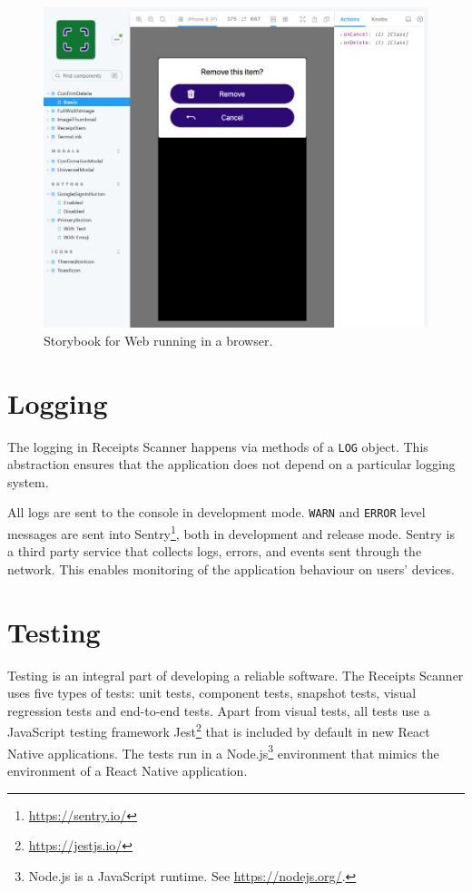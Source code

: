 \documentclass[
  printed, %
  table,   %
  oneside, %
  lof,     %
  lot,     %
]{fithesis3}
\begin{document}
\begin{figure}[H]
    \begin{center}
        \includegraphics[width=\textwidth]{figures/other/storybook_web}
    \end{center}
    \caption{Storybook for Web running in a browser.}
    \label{fig:storybook_web}
\end{figure}

\section{Logging}
The logging in Receipts Scanner happens via methods of a \texttt{LOG} object. This abstraction ensures that the application does not depend on a particular logging system.

All logs are sent to the console in development mode. \texttt{WARN} and \texttt{ERROR} level messages are sent into Sentry\footnote{\url{https://sentry.io/}}, both in development and release mode. Sentry is a third party service that collects logs, errors, and events sent through the network. This enables monitoring of the application behaviour on users' devices.

\section{Testing}
Testing is an integral part of developing a reliable software.
The Receipts Scanner uses five types of tests: unit tests, component tests, snapshot tests, visual regression tests and end-to-end tests.
Apart from visual tests, all tests use a JavaScript testing framework Jest\footnote{\url{https://jestjs.io/}} that is included by default in new React Native applications. The tests run in a Node.js\footnote{Node.js is a JavaScript runtime. See \url{https://nodejs.org/}.} environment that mimics the environment of a React Native application. 
\end{document}

